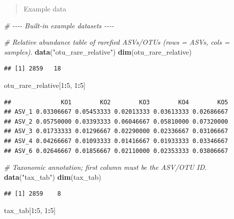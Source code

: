 \documentclass[
]{book}
\newenvironment{Shaded}{\begin{snugshade}}{\end{snugshade}}
\newcommand{\CommentTok}[1]{\textcolor[rgb]{0.56,0.35,0.01}{\textit{#1}}}
\newcommand{\DecValTok}[1]{\textcolor[rgb]{0.00,0.00,0.81}{#1}}
\newcommand{\FunctionTok}[1]{\textcolor[rgb]{0.13,0.29,0.53}{\textbf{#1}}}
\newcommand{\NormalTok}[1]{#1}
\newcommand{\SpecialCharTok}[1]{\textcolor[rgb]{0.81,0.36,0.00}{\textbf{#1}}}
\newcommand{\StringTok}[1]{\textcolor[rgb]{0.31,0.60,0.02}{#1}}
\begin{document}
\begin{quote}
Example data
\end{quote}

\begin{Shaded}
\begin{Highlighting}[]
\CommentTok{\# {-}{-}{-}{-} Built{-}in example datasets {-}{-}{-}{-}}

\CommentTok{\# Relative abundance table of rarefied ASVs/OTUs (rows = ASVs, cols = samples).}
\FunctionTok{data}\NormalTok{(}\StringTok{"otu\_rare\_relative"}\NormalTok{)}
\FunctionTok{dim}\NormalTok{(otu\_rare\_relative)}
\end{Highlighting}
\end{Shaded}

\begin{verbatim}
## [1] 2859   18
\end{verbatim}

\begin{Shaded}
\begin{Highlighting}[]
\NormalTok{otu\_rare\_relative[}\DecValTok{1}\SpecialCharTok{:}\DecValTok{5}\NormalTok{, }\DecValTok{1}\SpecialCharTok{:}\DecValTok{5}\NormalTok{]}
\end{Highlighting}
\end{Shaded}

\begin{verbatim}
##              KO1        KO2        KO3        KO4        KO5
## ASV_1 0.03306667 0.05453333 0.02013333 0.03613333 0.02686667
## ASV_2 0.05750000 0.03393333 0.06046667 0.05810000 0.07320000
## ASV_3 0.01733333 0.01296667 0.02290000 0.02336667 0.03106667
## ASV_4 0.04266667 0.01093333 0.01416667 0.01933333 0.03346667
## ASV_6 0.02646667 0.01856667 0.02110000 0.02353333 0.03806667
\end{verbatim}

\begin{Shaded}
\begin{Highlighting}[]
\CommentTok{\# Taxonomic annotation; first column must be the ASV/OTU ID.}
\FunctionTok{data}\NormalTok{(}\StringTok{"tax\_tab"}\NormalTok{)}
\FunctionTok{dim}\NormalTok{(tax\_tab)}
\end{Highlighting}
\end{Shaded}

\begin{verbatim}
## [1] 2859    8
\end{verbatim}

\begin{Shaded}
\begin{Highlighting}[]
\NormalTok{tax\_tab[}\DecValTok{1}\SpecialCharTok{:}\DecValTok{5}\NormalTok{, }\DecValTok{1}\SpecialCharTok{:}\DecValTok{5}\NormalTok{]}
\end{Highlighting}
\end{Shaded}
\end{document}
